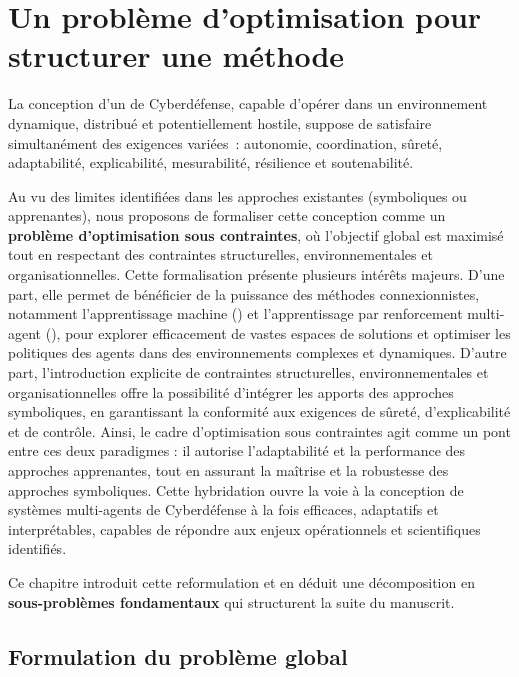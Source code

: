\clearpage
\thispagestyle{empty}
\null
\newpage

\chapter{Un problème d'optimisation pour structurer une méthode}
\label{chap:hypotheses}

La conception d'un  de Cyberdéfense, capable d'opérer dans un environnement dynamique, distribué et potentiellement hostile, suppose de satisfaire simultanément des exigences variées~: autonomie, coordination, sûreté, adaptabilité, explicabilité, mesurabilité, résilience et soutenabilité.

Au vu des limites identifiées dans les approches existantes (symboliques ou apprenantes), nous proposons de formaliser cette conception comme un \textbf{problème d'optimisation sous contraintes}, où l'objectif global est maximisé tout en respectant des contraintes structurelles, environnementales et organisationnelles.
Cette formalisation présente plusieurs intérêts majeurs. D'une part, elle permet de bénéficier de la puissance des méthodes connexionnistes, notamment l'apprentissage machine () et l'apprentissage par renforcement multi-agent (), pour explorer efficacement de vastes espaces de solutions et optimiser les politiques des agents dans des environnements complexes et dynamiques. D'autre part, l'introduction explicite de contraintes structurelles, environnementales et organisationnelles offre la possibilité d'intégrer les apports des approches symboliques, en garantissant la conformité aux exigences de sûreté, d'explicabilité et de contrôle. Ainsi, le cadre d'optimisation sous contraintes agit comme un pont entre ces deux paradigmes : il autorise l'adaptabilité et la performance des approches apprenantes, tout en assurant la maîtrise et la robustesse des approches symboliques. Cette hybridation ouvre la voie à la conception de systèmes multi-agents de Cyberdéfense à la fois efficaces, adaptatifs et interprétables, capables de répondre aux enjeux opérationnels et scientifiques identifiés.

Ce chapitre introduit cette reformulation et en déduit une décomposition en \textbf{sous-problèmes fondamentaux} qui structurent la suite du manuscrit.

\section{Formulation du problème global}

